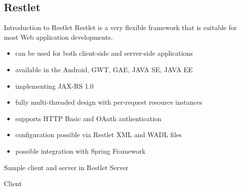 \subsection{Restlet}
	\begin{frame}{Introduction to Restlet}
		Restlet is a very flexible framework that is suitable for most Web application developments.	
		
		\begin{itemize}
		  \item can be used for both client-side and server-side applications
		  \item available in the Android, GWT, GAE, JAVA SE, JAVA EE
		  \item implementing JAX-RS 1.0
		  \item fully multi-threaded design with per-request resource instances
		  \item supports HTTP Basic and OAuth authentication
		  \item configuration possible via Restlet XML and WADL files
		  \item possible integration with Spring Framework
		\end{itemize}
	\end{frame}
	
	\begin{frame}{Sample client and server in Restlet}  
		Server
		
		Client
		
	\end{frame}

